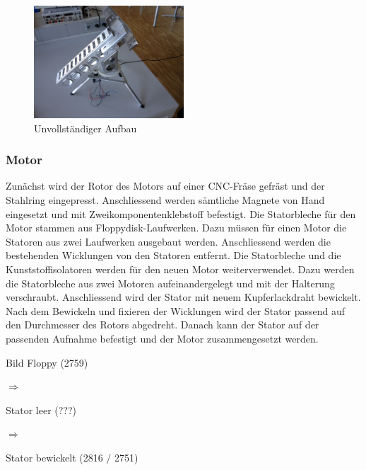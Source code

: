 \begin{figure}[h!]
	\centering
	\includegraphics[width=0.5\textwidth]{fig/IMG_2303.JPG}
	\caption{Unvollständiger Aufbau}
	\label{fig:Unvollständiger Aufbau}
\end{figure}

\subsubsection{Motor}
Zunächst wird der Rotor des Motors auf einer CNC-Fräse gefräst und der 
Stahlring eingepresst. Anschliessend werden sämtliche Magnete von Hand 
eingesetzt und mit Zweikomponentenklebstoff befestigt. Die Statorbleche für 
den Motor stammen aus Floppydisk-Laufwerken. Dazu müssen für einen Motor die 
Statoren aus zwei Laufwerken ausgebaut werden. Anschliessend werden die 
bestehenden Wicklungen von den Statoren entfernt. Die Statorbleche und die 
Kunststoffisolatoren werden für den neuen Motor weiterverwendet. Dazu werden 
die Statorbleche aus zwei Motoren aufeinandergelegt und mit der Halterung 
verschraubt. Anschliessend wird der Stator mit neuem Kupferlackdraht 
bewickelt. Nach dem Bewickeln und fixieren der Wicklungen wird der Stator 
passend auf den Durchmesser des Rotors abgedreht. Danach kann der Stator auf 
der passenden Aufnahme befestigt und der Motor zusammengesetzt werden. 
\begin{center}
    \begin{minipage}[c]{0.2\textwidth}
        Bild Floppy (2759)
    \end{minipage}
    \begin{minipage}[c]{0.1\textwidth}
        \Huge$\Rightarrow$
    \end{minipage}
    \begin{minipage}[c]{0.2\textwidth}
        Stator leer (???)
    \end{minipage}
    \begin{minipage}[c]{0.1\textwidth}
        \Huge$\Rightarrow$
    \end{minipage}
    \begin{minipage}[c]{0.2\textwidth}
        Stator bewickelt (2816 / 2751)
    \end{minipage}
\end{center}

